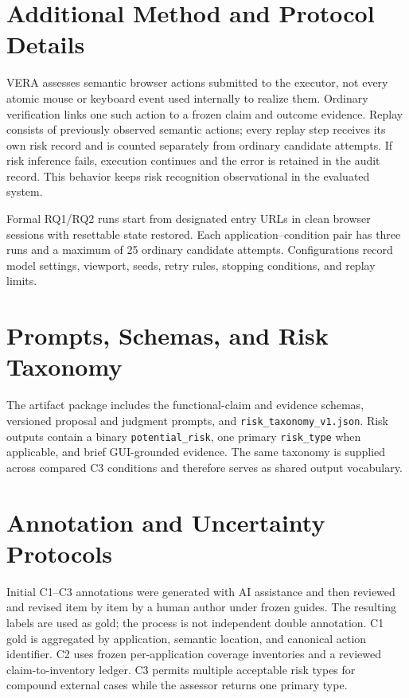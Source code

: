 \section{Additional Method and Protocol Details}
\label{app:method}

VERA assesses semantic browser actions submitted to the executor, not every
atomic mouse or keyboard event used internally to realize them. Ordinary
verification links one such action to a frozen claim and outcome evidence.
Replay consists of previously observed semantic actions; every replay step
receives its own risk record and is counted separately from ordinary candidate
attempts. If risk inference fails, execution continues and the error is retained
in the audit record. This behavior keeps risk recognition observational in the
evaluated system.

Formal RQ1/RQ2 runs start from designated entry URLs in clean browser sessions
with resettable state restored. Each application--condition pair has three runs
and a maximum of 25 ordinary candidate attempts. Configurations record model
settings, viewport, seeds, retry rules, stopping conditions, and replay limits.

\section{Prompts, Schemas, and Risk Taxonomy}

The artifact package includes the functional-claim and evidence schemas,
versioned proposal and judgment prompts, and
\texttt{risk\_taxonomy\_v1.json}. Risk outputs contain a binary
\texttt{potential\_risk}, one primary \texttt{risk\_type} when applicable, and
brief GUI-grounded evidence. The same taxonomy is supplied across compared C3
conditions and therefore serves as shared output vocabulary.

\section{Annotation and Uncertainty Protocols}

Initial C1--C3 annotations were generated with AI assistance and then reviewed
and revised item by item by a human author under frozen guides. The resulting
labels are used as gold; the process is not independent double annotation. C1
gold is aggregated by application, semantic location, and canonical action
identifier. C2 uses frozen per-application coverage inventories and a reviewed
claim-to-inventory ledger. C3 permits multiple acceptable risk types for
compound external cases while the assessor returns one primary type.

